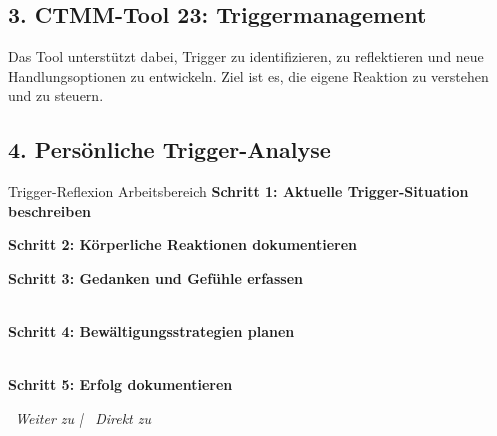 \subsection*{\textcolor{ctmmOrange}{3. CTMM-Tool 23: Triggermanagement}}

Das Tool unterstützt dabei, Trigger zu identifizieren, zu reflektieren und neue Handlungsoptionen zu entwickeln. Ziel ist es, die eigene Reaktion zu verstehen und zu steuern.

\subsection*{\textcolor{ctmmOrange}{4. Persönliche Trigger-Analyse}}

\begin{ctmmBlueBox}{Trigger-Reflexion Arbeitsbereich}
\textbf{Schritt 1: Aktuelle Trigger-Situation beschreiben}\\

\vspace{0.5cm}
\textbf{Schritt 2: Körperliche Reaktionen dokumentieren}\\

\vspace{0.5cm}
\textbf{Schritt 3: Gedanken und Gefühle erfassen}\\
\\[0.3cm]

\vspace{0.5cm}
\textbf{Schritt 4: Bewältigungsstrategien planen}\\
\\[0.3cm]

\vspace{0.5cm}
\textbf{Schritt 5: Erfolg dokumentieren}\\
\end{ctmmBlueBox}

\vspace{1cm}
\begin{center}
\textit{\textcolor{ctmmGreen}{\faChevronRight~Weiter zu}  | \textcolor{ctmmRed}{\faBookmark~Direkt zu} }
\end{center}
